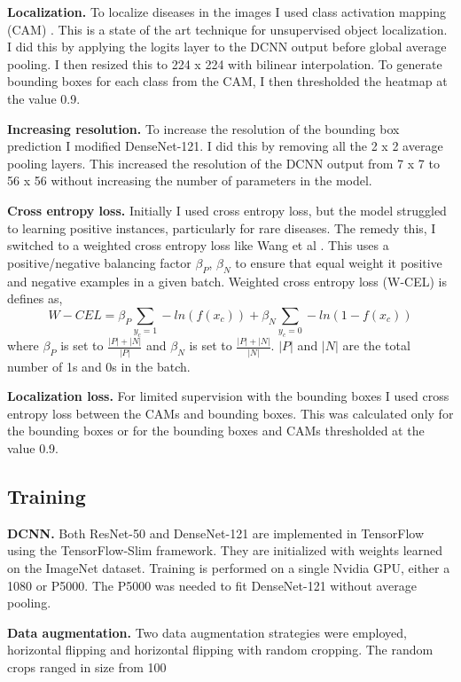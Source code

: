 \documentclass{article}
\begin{document}
{\bf Localization.} To localize diseases in the images I used class activation mapping (CAM) \cite{Zhou}. This is a state of the art technique for unsupervised object localization. I did this by applying the logits layer to the DCNN output before global average pooling. I then resized this to 224 x 224 with bilinear interpolation. To generate bounding boxes for each class from the CAM, I then thresholded the heatmap at the value 0.9.

{\bf Increasing resolution.} To increase the resolution of the bounding box prediction I modified DenseNet-121. I did this by removing all the 2 x 2 average pooling layers. This increased the resolution of the DCNN output from 7 x 7 to 56 x 56 without increasing the number of parameters in the model.

{\bf Cross entropy loss.} Initially I used cross entropy loss, but the model struggled to learning positive instances, particularly for rare diseases. The remedy this, I switched to a weighted cross entropy loss like Wang et al \cite{Wang}. This uses a positive/negative balancing factor $ {\beta}_P $, $ {\beta}_N $
to ensure that equal weight it positive and negative examples in a given batch.
Weighted cross entropy loss (W-CEL) is defines as,
\begin{equation}
W-CEL = {\beta}_P\sum_{y_c=1}-ln(f(x_c)) + {\beta}_N\sum_{y_c=0}-ln(1-f(x_c))
\end{equation}
where $ {\beta}_P $ is set to $ \frac{|P| + |N|}{|P|} $ and $ {\beta}_N $ is set to $ \frac{|P| + |N|}{|N|} $.
$|P|$ and $|N|$ are the total number of 1s and 0s in the batch.

{\bf Localization loss.} For limited supervision with the bounding boxes I used cross entropy loss between the CAMs and bounding boxes. This was calculated only for the bounding boxes or for the bounding boxes and CAMs thresholded at the value 0.9.

\subsection{Training}

{\bf DCNN.} Both ResNet-50 and DenseNet-121 are implemented in TensorFlow using the TensorFlow-Slim framework. They are initialized with weights learned on the ImageNet dataset. Training is performed on a single Nvidia GPU, either a 1080 or P5000. The P5000 was needed to fit DenseNet-121 without average pooling.

{\bf Data augmentation.} Two data augmentation strategies were employed, horizontal flipping and horizontal flipping with random cropping. The random crops ranged in size from 100%
\end{document}
